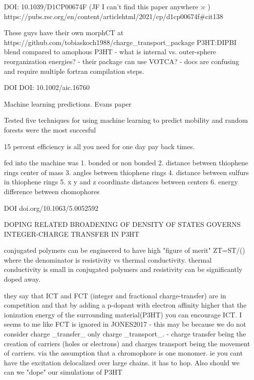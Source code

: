 

DOI: 10.1039/D1CP00674F (JF I can't find this paper anywhere :c )
https://pubs.rsc.org/en/content/articlehtml/2021/cp/d1cp00674f#cit138

    These guys have their own morphCT at https://github.com/tobiaskoch1988/charge_transport_package
    P3HT:DIPBI blend compared to amophous P3HT
    - what is internal vs. outer-sphere reorganization energies?
    - their package can use VOTCA?
    - docs are confusing and require multiple fortran compilation steps.

DOI DOI: 10.1002/aic.16760

    Machine learning predictions. Evans paper

    Tested five techniques for using machine learning to predict mobility and random forests were the most succesful

    15 percent efficiency is all you need for one day pay back times.

    fed into the machine was 1. bonded or non bonded
                                2. distance between thiophene rings center of mass
                                3. angles between thiophene rings
                                4. distance between sulfurs in thiophene rings
                                5. x y and z coordinate distances between centers
                                6. energy difference between chomophores


DOI doi.org/10.1063/5.0052592 

    DOPING RELATED BROADENING OF DENSITY OF STATES GOVERNS INTEGER-CHARGE TRANSFER IN P3HT
    
    conjugated polymers can be engineered to have high "figure of merit" ZT=ST/(\rho*\kappa) where the denominator 
    is resistivity vs thermal conductivity. thermal conductivity is small in conjugated polymers and resistivity can be 
    significantly doped away. 

    they say that ICT and FCT (integer and fractional charge-transfer) are in competition and that by adding a p-dopant with electron affinity higher that the
    ionization energy of the surrounding material(P3HT) you can encourage ICT. I seems to me like FCT is ignored in JONES2017
        - this may be because we do not consider charge _transfer_ only charge _transport_.
        - charge transfer being the creation of carriers (holes or electrons) and charges transport being the movement of carriers.
    via the assumption that a chromophore is one monomer. ie you cant have the excitation delocalized over large chains. it has to hop. 
    Also should we can we "dope" our simulations of P3HT

